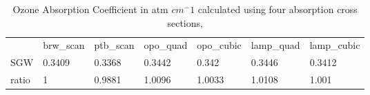 \documentclass[acp]{copernicus} %
\begin{document}
\begin{table}[t]
\caption{Ozone Absorption Coefficient in atm $cm^-1$ calculated using  four absorption cross sections, }
\begin{tabular}{lllllll}
\tophline
     & brw\_scan & ptb\_scan & opo\_quad & opo\_cubic & lamp\_quad & lamp\_cubic \\
\middlehline
SGW   & 0.3409    & 0.3368    & 0.3442    & 0.342      & 0.3446     & 0.3412      \\
ratio & 1         & 0.9881    & 1.0096    & 1.0033     & 1.0108     & 1.001      
\bottomhline
\end{tabular}
\belowtable{} %
\label{tab:o3abs_sum}
\end{table}













\end{document}
